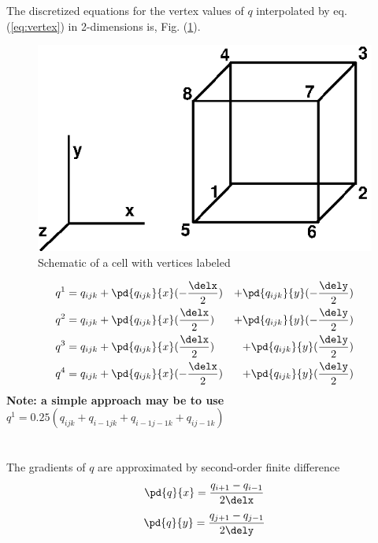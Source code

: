 \documentclass[fleqn]{article}
\begin{document}
{The discretized equations for the vertex values of $q$ interpolated by
eq. (\ref{eq:vertex}) in 2-dimensions is, Fig. (\ref{Fig:cell}).
%
%
\begin{figure}
    \center
    \includegraphics{advect_cell_vertices.eps}
    \caption{Schematic of a cell with vertices labeled}
    \label{Fig:cell}
\end{figure}
%
%
\begin{alignat}{2}
    &q^{1} = q_{ijk} 
+   \pd{q_{ijk}}{x}(- \frac{\delx}{2}) 
&+  \pd{q_{ijk}}{y}(- \frac{\dely}{2})
    \label{eq:vertex1} 
%
\\
%
    &q^{2} = q_{ijk} 
+   \pd{q_{ijk}}{x}(\frac{\delx}{2}) 
&+  \pd{q_{ijk}}{y}(- \frac{\dely}{2}) 
%
\\
%
    &q^{3} = q_{ijk} 
+   \pd{q_{ijk}}{x}(\frac{\delx}{2}) 
&+  \pd{q_{ijk}}{y}(\frac{\dely}{2}) 
%
\\
%
    &q^{4} = q_{ijk} 
+   \pd{q_{ijk}}{x}(-\frac{\delx}{2}) 
&+   \pd{q_{ijk}}{y}(\frac{\dely}{2}) 
    \label{eq:vertex4}
\end{alignat}
%
%
\textbf{Note: a simple approach may be to use} 
\\
$q^{1} = 0.25( q_{ijk} + q_{i-1jk} + q_{i-1j-1k} + q_{ij-1k} )$\\
\\
\\
The gradients of $q$ are approximated by second-order finite difference
%
%
\begin{equation}
    \pd{q}{x} = \frac{q_{i+1} - q_{i-1}}{2\delx}
\end{equation}
%
%
\begin{equation}
    \pd{q}{y} = \frac{q_{j+1} - q_{j-1}}{2\dely}
\end{equation}
%
%
%
%
}
\end{document}
